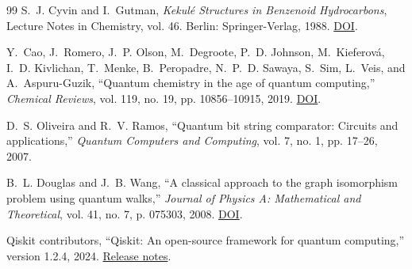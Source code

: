 \documentclass[11pt,letterpaper]{article}
\begin{document}
\begin{thebibliography}{99}
S.~J. Cyvin and I.~Gutman, \emph{Kekul\'{e} Structures in Benzenoid Hydrocarbons}, Lecture Notes in Chemistry, vol. 46. Berlin: Springer-Verlag, 1988. \href{https://doi.org/10.1007/978-3-662-00892-8}{DOI}.

Y.~Cao, J.~Romero, J.~P. Olson, M.~Degroote, P.~D. Johnson, M.~Kieferov\'{a}, I.~D. Kivlichan, T.~Menke, B.~Peropadre, N.~P.~D. Sawaya, S.~Sim, L.~Veis, and A.~Aspuru-Guzik, ``Quantum chemistry in the age of quantum computing,'' \emph{Chemical Reviews}, vol. 119, no. 19, pp. 10856--10915, 2019. \href{https://doi.org/10.1021/acs.chemrev.8b00803}{DOI}.

D.~S. Oliveira and R.~V. Ramos, ``Quantum bit string comparator: Circuits and applications,'' \emph{Quantum Computers and Computing}, vol. 7, no. 1, pp. 17--26, 2007.

B.~L. Douglas and J.~B. Wang, ``A classical approach to the graph isomorphism problem using quantum walks,'' \emph{Journal of Physics A: Mathematical and Theoretical}, vol. 41, no. 7, p. 075303, 2008. \href{https://doi.org/10.1088/1751-8113/41/7/075303}{DOI}.

Qiskit contributors, ``Qiskit: An open-source framework for quantum computing,'' version 1.2.4, 2024. \href{https://quantum.cloud.ibm.com/docs/en/api/qiskit/release-notes/1.2#124}{Release notes}.

\end{thebibliography}
\end{document}
